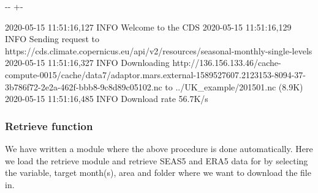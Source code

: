 \documentclass[letterpaper,10pt,english]{sphinxmanual}
\newlength\nbsphinxcodecellspacing
\begin{document}
{
\begin{sphinxVerbatim}[commandchars=\\\{\}]
\llap{\color{nbsphinxin}[97]:\,\hspace{\fboxrule}\hspace{\fboxsep}}

  
  
  
       
                      


\end{sphinxVerbatim}
}

{

\kern-\sphinxverbatimsmallskipamount\kern-\baselineskip
\kern+\FrameHeightAdjust\kern-\fboxrule
\vspace{\nbsphinxcodecellspacing}

\begin{sphinxVerbatim}[commandchars=\\\{\}]
2020-05-15 11:51:16,127 INFO Welcome to the CDS
2020-05-15 11:51:16,129 INFO Sending request to https://cds.climate.copernicus.eu/api/v2/resources/seasonal-monthly-single-levels
2020-05-15 11:51:16,327 INFO Downloading http://136.156.133.46/cache-compute-0015/cache/data7/adaptor.mars.external-1589527607.2123153-8094-37-3b786f72-2e2a-462f-bbb8-9c8d89c05102.nc to ../UK\_example/201501.nc (8.9K)
2020-05-15 11:51:16,485 INFO Download rate 56.7K/s
\end{sphinxVerbatim}
}


\subsubsection{Retrieve function}
\label{\detokenize{Notebooks/1.Download/1.Retrieve:Retrieve-function}}
We have written a module where the above procedure is done automatically. Here we load the retrieve module and retrieve SEAS5 and ERA5 data for  by selecting the variable, target month(s), area and folder where we want to download the file in.
\end{document}
